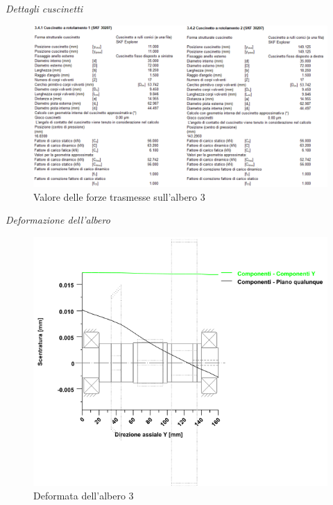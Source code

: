 \emph{Dettagli cuscinetti}
\begin{figure}[h]
    \centering
    \includegraphics[scale=0.5]{Immagini/Forze3CuscinettiAlbero3.png}
    \caption{Valore delle forze trasmesse sull'albero 3}
    \label{fig:Forze3CusinettiAlbero3}
\end{figure}
\newpage
\emph{Deformazione dell'albero}
\begin{figure}[h]
    \centering
    \includegraphics[scale=0.5]{Immagini/Deformata3Albero3.png}
    \caption{Deformata dell'albero 3}
    \label{fig:Deformata3Albero3}
\end{figure}

